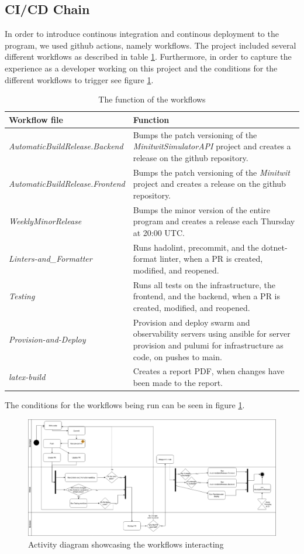 \subsection{CI/CD Chain} %

In order to introduce continous integration and continous deployment to the program, we used github actions, namely workflows. The project included several different workflows as described in table \ref{tab:workflows}. Furthermore, in order to capture the experience as a developer working on this project and the conditions for the different workflows to trigger see figure \ref{fig:workflows}.

\begin{table}[]
    \centering
    \begin{tabular}{l|l}
        \textbf{Workflow file} & \textbf{Function}\\
        \hline
        \textit{AutomaticBuildRelease.Backend} &  Bumps the patch versioning of the \textit{MinitwitSimulatorAPI} project and creates a release on the github repository.\\
        \textit{AutomaticBuildRelease.Frontend} & Bumps the patch versioning of the \textit{Minitwit} project and creates a release on the github repository.\\
        \textit{WeeklyMinorRelease} & Bumps the minor version of the entire program and creates a release each Thursday at 20:00 UTC.\\
        \textit{Linters-and\_Formatter} & Runs hadolint, precommit, and the dotnet-format linter, when a PR is created, modified, and reopened.\\
        \textit{Testing} & Runs all tests on the infrastructure, the frontend, and the backend, when a PR is created, modified, and reopened.\\
        \textit{Provision-and-Deploy} & Provision and deploy swarm and observability servers using ansible for server provision and pulumi for infrastructure as code, on pushes to main.\\
        \textit{latex-build} & Creates a report PDF, when changes have been made to the report.
    \end{tabular}
    \caption{The function of the workflows}
    \label{tab:workflows}
\end{table}

The conditions for the workflows being run can be seen in figure \ref{fig:workflows}.

\begin{figure}
    \centering
    \includegraphics{report/images/Github-Actions.png}
    \caption{Activity diagram showcasing the workflows interacting }
    \label{fig:workflows}
\end{figure}

